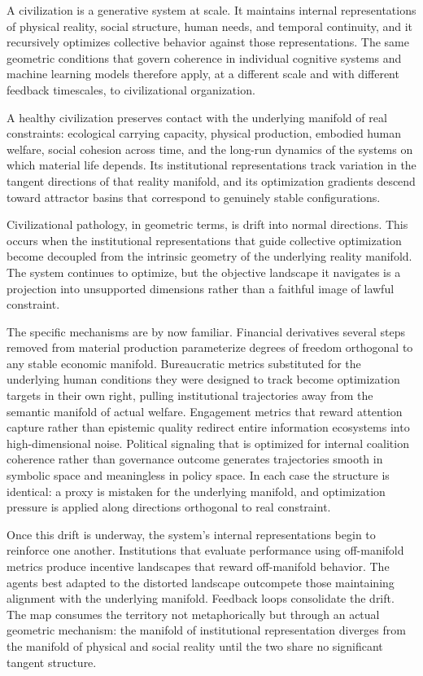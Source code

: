 \documentclass[11pt,a4paper,twocolumn]{article}
\begin{document}
A civilization is a generative system at scale. It maintains
internal representations of physical reality, social structure,
human needs, and temporal continuity, and it recursively
optimizes collective behavior against those representations.
The same geometric conditions that govern coherence in individual
cognitive systems and machine learning models therefore apply,
at a different scale and with different feedback timescales, to
civilizational organization.

A healthy civilization preserves contact with the underlying
manifold of real constraints: ecological carrying capacity,
physical production, embodied human welfare, social cohesion
across time, and the long-run dynamics of the systems on which
material life depends. Its institutional representations track
variation in the tangent directions of that reality manifold,
and its optimization gradients descend toward attractor basins
that correspond to genuinely stable configurations.

Civilizational pathology, in geometric terms, is drift into
normal directions. This occurs when the institutional
representations that guide collective optimization become
decoupled from the intrinsic geometry of the underlying
reality manifold. The system continues to optimize, but the
objective landscape it navigates is a projection into
unsupported dimensions rather than a faithful image of lawful
constraint.

The specific mechanisms are by now familiar. Financial
derivatives several steps removed from material production
parameterize degrees of freedom orthogonal to any stable
economic manifold. Bureaucratic metrics substituted for
the underlying human conditions they were designed to track
become optimization targets in their own right, pulling
institutional trajectories away from the semantic manifold
of actual welfare. Engagement metrics that reward attention
capture rather than epistemic quality redirect entire
information ecosystems into high-dimensional noise. Political
signaling that is optimized for internal coalition coherence
rather than governance outcome generates trajectories
smooth in symbolic space and meaningless in policy space.
In each case the structure is identical: a proxy is
mistaken for the underlying manifold, and optimization
pressure is applied along directions orthogonal to real
constraint.

Once this drift is underway, the system's internal
representations begin to reinforce one another. Institutions
that evaluate performance using off-manifold metrics produce
incentive landscapes that reward off-manifold behavior. The
agents best adapted to the distorted landscape outcompete
those maintaining alignment with the underlying manifold.
Feedback loops consolidate the drift. The map consumes the
territory not metaphorically but through an actual geometric
mechanism: the manifold of institutional representation
diverges from the manifold of physical and social reality
until the two share no significant tangent structure.
\end{document}
